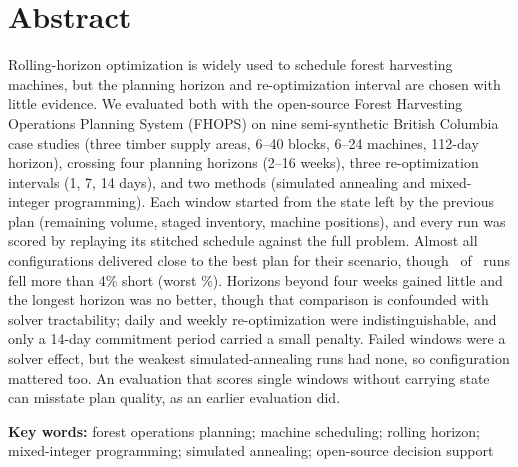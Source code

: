 \section*{Abstract}
Rolling-horizon optimization is widely used to schedule forest harvesting machines, but the planning
horizon and re-optimization interval are chosen with little evidence. We evaluated both with the
open-source Forest Harvesting Operations Planning System
(FHOPS) on nine semi-synthetic British Columbia case studies (three timber supply areas, 6--40
blocks, 6--24 machines, 112-day horizon), crossing four planning horizons (2--16 weeks), three
re-optimization intervals (1, 7, 14 days), and two methods (simulated annealing and mixed-integer
programming). Each window started from the state left by the previous plan (remaining volume,
staged inventory, machine positions), and every run was scored by replaying its stitched schedule
against the full problem. Almost all configurations delivered close to the best plan for their
scenario, though \NRunsBeyondFourPct\ of \NRollingRuns\ runs fell more than 4\% short (worst
\RelBestWorstRolling\%). Horizons beyond four weeks gained little and the longest horizon
was no better, though that comparison is confounded with solver tractability; daily and weekly
re-optimization were indistinguishable, and only a 14-day commitment period carried a small penalty.
Failed windows were a solver effect, but the weakest simulated-annealing runs had none, so
configuration mattered too. An evaluation that scores single windows without carrying state can
misstate plan quality, as an earlier evaluation did.

\vspace{1em}
\noindent\textbf{Key words:} forest operations planning; machine scheduling; rolling horizon;
mixed-integer programming; simulated annealing; open-source decision support

\clearpage
